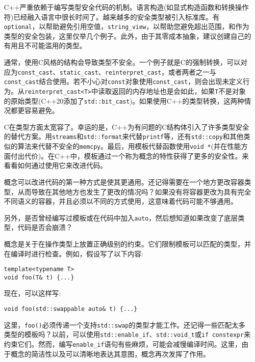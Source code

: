 
C++严重依赖于编写类型安全代码的机制。语言构造(如显式构造函数和转换操作符)已经融入语言中很长时间了。越来越多的安全类型被引入标准库。有\texttt{optional}，以帮助避免引用空值，\texttt{string\_view}，以帮助您避免超出范围，和作为类型的安全包装，这里仅举几个例子。此外，由于其零成本抽象，建议创建自己的有用且不可能滥用的类型。

通常，使用C风格的结构会导致类型不安全。一个例子就是C的强制转换，可以对应为\texttt{const\_cast}、\texttt{static\_cast}、\texttt{reinterpret\_cast}，或者两者之一与\texttt{const\_cast}结合使用。若不小心对\texttt{const}对象使用\texttt{const\_cast}，则会出现未定义行为。从\texttt{reinterpret\_cast<T>}中读取返回的内存地址也是会如此，如果\texttt{T}不是对象的原始类型(C++20添加了\texttt{std::bit\_cast})。如果使用C++的类型转换，这两种情况都更容易避免。

C在类型方面太宽容了。幸运的是，C++为有问题的C结构体引入了许多类型安全的替代方案。用\texttt{streams}和\texttt{std::format}来代替\texttt{printf}等，还有\texttt{std::copy}和其他类似的算法来代替不安全的\texttt{memcpy}。最后，用模板代替函数使用\texttt{void *}(并在性能方面付出代价)。在C++中，模板通过一个称为概念的特性获得了更多的安全性。来看看如何通过使用它来改进代码。


概念可以改进代码的第一种方式是使其更通用。还记得需要在一个地方更改容器类型，从而导致在其他地方也发生了更改的情况吗？如果没有将容器更改为具有完全不同语义的容器，并且必须以不同的方式使用，这意味着代码可能不够通用。

另外，是否曾经编写过模板或在代码中加入\texttt{auto}，然后想知道如果改变了底层类型，代码是否会崩溃？

概念是关于在操作类型上放置正确级别的约束。它们限制模板可以匹配的类型，并在编译时进行检查。例如，假设写了以下内容:

\begin{lstlisting}[style=styleCXX]
template<typename T>
void foo(T& t) {...}
\end{lstlisting}

现在，可以这样写:

\begin{lstlisting}[style=styleCXX]
void foo(std::swappable auto& t) {...}
\end{lstlisting}

这里，\texttt{foo()}必须传递一个支持\texttt{std::swap}的类型才能工作。还记得一些匹配太多类型的模板吗？以前，可以使用\texttt{std::enable\_if}、\texttt{std::void\_t}或\texttt{if constexpr}来约束它们。然而，编写\texttt{enable\_if}语句有些麻烦，可能会减慢编译时间。这里，由于概念的简洁性以及可以清晰地表达其意图，概念再次发挥了作用。

